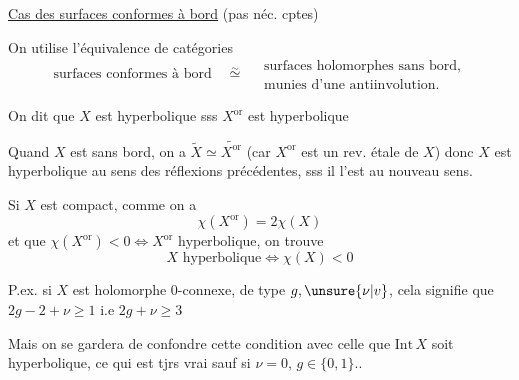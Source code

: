 
\uline{Cas des surfaces conformes à bord} (pas néc. cptes)

On utilise l'équivalence de catégories
\[
\text{surfaces conformes à bord}\quad\overset{\sim}{\simeq}\quad
\begin{gathered}\text{surfaces holomorphes sans bord,}\\
\text{munies d'une antiinvolution.}\end{gathered}
\]

On dit que $X$ est hyperbolique sss $X^{\mathrm{or}}$ est hyperbolique 

Quand $X$ est sans bord, on a $\widetilde X\simeq\widetilde{X^{\mathrm{or}}}$ (car $X^{\mathrm{or}}$ est un rev. étale de $X$) donc $X$ est hyperbolique au sens des réflexions précédentes, sss il l'est au nouveau sens.

Si $X$ est compact,  comme on a
\[
\chi(X^{\mathrm{or}})=2\chi(X)
\]
et que $\chi(X^{\mathrm{or}})<0\Longleftrightarrow X^{\mathrm{or}}\text{ hyperbolique}$, on trouve
\[
X\text{ hyperbolique}\Longleftrightarrow\chi(X)<0
\]

P.ex. si $X$ est holomorphe 0-connexe, de type $g,\unsure{\nu|v}$, cela signifie que $2g-2+\nu\geq1$ i.e $2g+\nu\geq3$

Mais on se gardera de confondre cette condition avec celle que $\mathrm{Int}\,X$ soit hyperbolique, ce qui est tjrs vrai sauf si $\nu=0$, $g\in\{0,1\}$..
